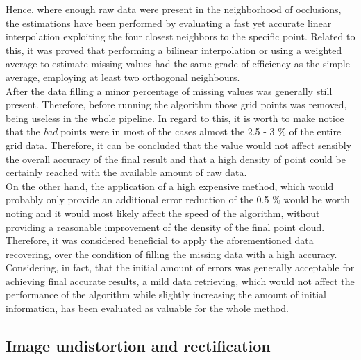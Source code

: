 Hence, where enough raw data were present in the neighborhood of occlusions, the estimations have been performed by evaluating a fast yet accurate linear interpolation exploiting the four closest neighbors to the specific point. 
Related to this, it was proved that performing a bilinear interpolation or using a weighted average to estimate missing values had the same grade of efficiency as the simple average, employing at least two orthogonal neighbours. \\
After the data filling a minor percentage of missing values was generally still present. 
Therefore, before running the algorithm those grid points was removed, being useless in the whole pipeline.
In regard to this, it is worth to make notice that the \textit{bad} points were in most of the cases almost the 2.5 - 3 \% of the entire grid data. 
Therefore, it can be concluded that the value would not affect sensibly the overall accuracy of the final result and that a high density of point could be certainly reached with the available amount of raw data.\\
On the other hand, the application of a high expensive method, which would probably only provide an additional error reduction of the 0.5 \% would be worth noting and it would most likely affect the speed of the algorithm, without providing a reasonable improvement of the density of the final point cloud.
Therefore, it was considered beneficial to apply the aforementioned data recovering, over the condition of filling the missing data with a high accuracy. 
Considering, in fact, that the initial amount of errors was generally acceptable for achieving final accurate results, a mild data retrieving, which would not affect the performance of the algorithm while slightly increasing the amount of initial information, has been evaluated as valuable for the whole method.

\subsection{Image undistortion and rectification}
\label{subsection:img-undist-and-rectific}

